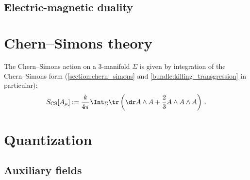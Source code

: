 \subsection{Electric-magnetic duality}


\section{Chern--Simons theory}\label{section:chern_simons_theory}

    The Chern--Simons action on a 3-manifold $\Sigma$ is given by integration of the Chern--Simons form (\cref{section:chern_simons} and \cref{bundle:killing_transgression} in particular):
    \begin{gather}
        S_{\mathrm{CS}}[A_\mu] := \frac{k}{4\pi}\Int_\Sigma\tr\left(\dr A\wedge A + \frac{2}{3}A\wedge A\wedge A\right)\,.
    \end{gather}

\section{Quantization}
\subsection{Auxiliary fields}\label{section:gauge_auxiliary_fields}